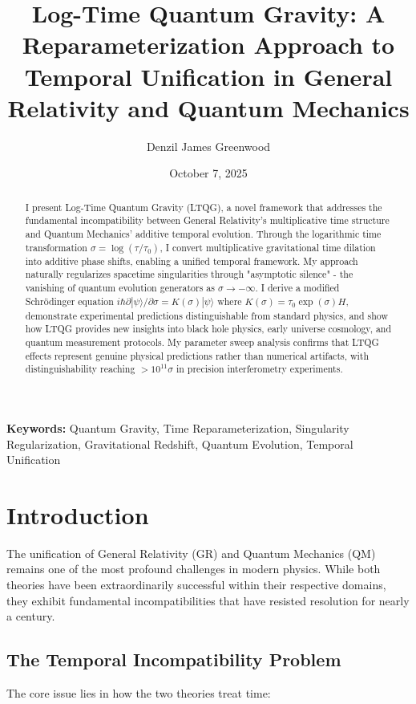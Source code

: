 \documentclass[12pt,a4paper]{article}
\title{\textbf{Log-Time Quantum Gravity: A Reparameterization Approach to Temporal Unification in General Relativity and Quantum Mechanics}}
\author[1]{Denzil James Greenwood}
\affil[1]{Independent Researcher}
\date{October 7, 2025}
\begin{document}
\maketitle

\begin{abstract}
I present Log-Time Quantum Gravity (LTQG), a novel framework that addresses the fundamental incompatibility between General Relativity's multiplicative time structure and Quantum Mechanics' additive temporal evolution. Through the logarithmic time transformation $\sigma = \log(\tau/\tau_0)$, I convert multiplicative gravitational time dilation into additive phase shifts, enabling a unified temporal framework. My approach naturally regularizes spacetime singularities through "asymptotic silence" - the vanishing of quantum evolution generators as $\sigma \to -\infty$. I derive a modified Schrödinger equation $i\hbar \partial|\psi\rangle/\partial\sigma = K(\sigma)|\psi\rangle$ where $K(\sigma) = \tau_0 \exp(\sigma) H$, demonstrate experimental predictions distinguishable from standard physics, and show how LTQG provides new insights into black hole physics, early universe cosmology, and quantum measurement protocols. My parameter sweep analysis confirms that LTQG effects represent genuine physical predictions rather than numerical artifacts, with distinguishability reaching $>10^{11}\sigma$ in precision interferometry experiments.
\end{abstract}

\textbf{Keywords:} Quantum Gravity, Time Reparameterization, Singularity Regularization, Gravitational Redshift, Quantum Evolution, Temporal Unification

\section{Introduction}

The unification of General Relativity (GR) and Quantum Mechanics (QM) remains one of the most profound challenges in modern physics. While both theories have been extraordinarily successful within their respective domains, they exhibit fundamental incompatibilities that have resisted resolution for nearly a century.

\subsection{The Temporal Incompatibility Problem}

The core issue lies in how the two theories treat time:
\end{document}

